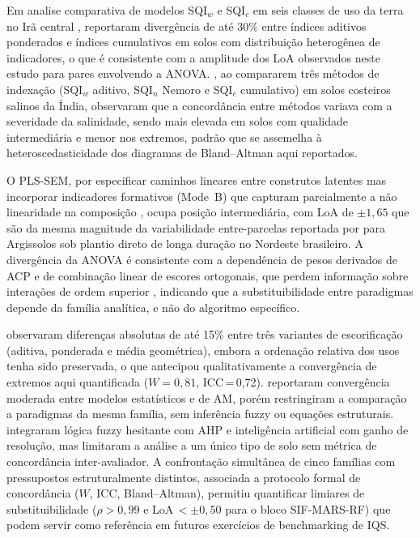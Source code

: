 \documentclass[pdflatex,sn-basic]{sn-jnl}%
\begin{document}
Em analise comparativa de modelos SQI$_w$ e SQI$_c$ em seis classes de uso da terra no Irã central \cite{Emami2024}, reportaram divergência de até 30\% entre índices aditivos ponderados e índices cumulativos em solos com distribuição heterogênea de indicadores, o que é consistente com a amplitude dos LoA observados neste estudo para pares envolvendo a ANOVA.  \cite{Mahajan2021}, ao compararem três métodos de indexação (SQI$_w$ aditivo, SQI$_n$ Nemoro e SQI$_c$ cumulativo) em solos costeiros salinos da Índia, observaram que a concordância entre métodos variava com a severidade da salinidade, sendo mais elevada em solos com qualidade intermediária e menor nos extremos, padrão que se assemelha à heteroscedasticidade dos diagramas de Bland--Altman aqui reportados. 

O PLS-SEM, por especificar caminhos lineares entre construtos latentes mas incorporar indicadores formativos (Mode~B) que capturam parcialmente a não linearidade na composição \cite{Diamantopoulos2008}, ocupa posição intermediária, com LoA de $\pm 1{,}65$ que são da mesma magnitude da variabilidade entre-parcelas reportada por \cite{Oliveira2020} para Argissolos sob plantio direto de longa duração no Nordeste brasileiro. A divergência da ANOVA é consistente com a dependência de pesos derivados de ACP e de combinação linear de escores ortogonais, que perdem informação sobre interações de ordem superior \cite{Andrews2002,Bünemann2018}, indicando que a substituibilidade entre paradigmas depende da família analítica, e não do algoritmo específico.

\cite{Mukherjee2014} observaram diferenças absolutas de até 15\% entre três variantes de escorificação (aditiva, ponderada e média geométrica), embora a ordenação relativa dos usos tenha sido preservada, o que antecipou qualitativamente a convergência de extremos aqui quantificada ($W = 0{,}81$, ICC\,=\,0{,}72). \cite{Chaudhry2024} reportaram convergência moderada entre modelos estatísticos e de AM, porém restringiram a comparação a paradigmas da mesma família, sem inferência fuzzy ou equações estruturais. \cite{Pacci2026} integraram lógica fuzzy hesitante com AHP e inteligência artificial com ganho de resolução, mas limitaram a análise a um único tipo de solo sem métrica de concordância inter-avaliador. A confrontação simultânea de cinco famílias com pressupostos estruturalmente distintos, associada a protocolo formal de concordância ($W$, ICC, Bland--Altman), permitiu quantificar limiares de substituibilidade ($\rho > 0{,}99$ e LoA\,$< \pm 0{,}50$ para o bloco SIF-MARS-RF) que podem servir como referência em futuros exercícios de benchmarking de IQS.
\end{document}
